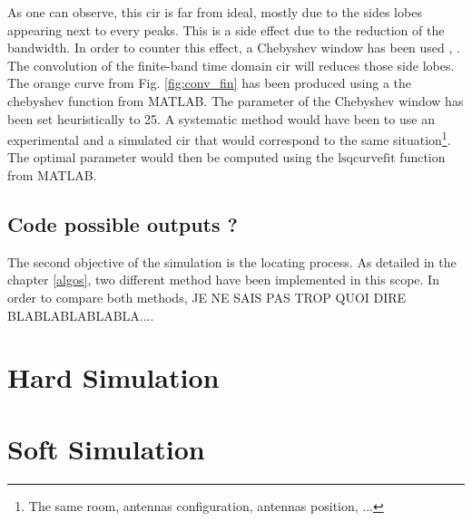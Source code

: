 As one can observe, this \gls{cir} is far from ideal, mostly due to the sides lobes appearing next to every peaks. This is a side effect due to the reduction of the bandwidth. In order to counter this effect, a Chebyshev window has been used \cite{lynch1997dolph}, \cite{mathworks}. The convolution of the finite-band time domain \gls{cir} will reduces those side lobes. The orange curve from Fig. \ref{fig:conv_fin} has been produced using a the $\text{chebyshev}$ function from MATLAB. The parameter of the Chebyshev window has been set heuristically to 25. A systematic method would have been to use an experimental and a simulated \gls{cir} that would correspond to the same situation\footnote{The same room, antennas configuration, antennas position, ...}. The optimal parameter would then be computed using the $\text{lsqcurvefit}$ function from MATLAB.

\subsection{Code possible outputs ?}

The second objective of the simulation is the locating process. As detailed in the chapter \ref{algos}, two different method have been implemented in this scope. In order to compare both methods, JE NE SAIS PAS TROP QUOI DIRE BLABLABLABLABLA....

\section{Hard Simulation}


\section{Soft Simulation}
